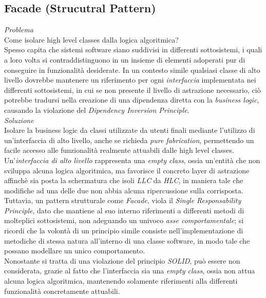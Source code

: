 \documentclass{article}
\begin{document}
\subsection*{Facade (Strucutral Pattern)}
\large
\textit{Problema}\\
Come isolare high level classes dalla logica algoritmica?\vspace*{14pt}\\
Spesso capita che sistemi software siano suddivisi in differenti sottosistemi, i quali a loro volta si contraddistinguono in un insieme di elementi adoperati pur di conseguire in funzionalità desiderate. In un contesto simile qualsiasi classe di alto livello dovrebbe mantenere un riferimento per ogni \textit{interfaccia} implementata nei differenti sottosistemi, in cui se non presente il livello di astrazione necessario, ciò potrebbe tradursi nella creazione di una dipendenza diretta con la \textit{business logic}, causando la violazione del \textit{Dipendency Inversion Principle}.\vspace*{14pt}\\
\textit{Soluzione}\\
Isolare la business logic da classi utilizzate da utenti finali mediante l'utilizzo di un'interfaccia di alto livello, anche se richieda \textit{pure fabrication}, permettendo un facile accesso alle funzionalità realmente attuabili dalle high level classes.\vspace*{14pt}\\
Un'\textit{interfaccia di alto livello} rappresenta una \textit{empty class}, ossia un'entità che non sviluppa alcuna logica algoritmica, ma favorisce il concreto layer di astrazione affinchè sia posta la schermatura che isoli \textit{LLC} da \textit{HLC}, in maniera tale che modifiche ad una delle due non abbia alcuna ripercussione sulla corrisposta.\vspace*{7pt}\\
Tuttavia, un pattern strutturale come \textit{Facade}, viola il \textit{Single Responsability Principle}, dato che mantiene al suo interno riferimenti a differenti metodi di molteplici sottosistemi, non adeguando un univoco \textit{asse comportamentale}; si ricordi che la volontà di un principio simile consiste nell'implementazione di metodiche di stessa natura all'interno di una classe software, in modo tale che possano modellare un unico comportamento.\vspace*{7pt}\\
Nonostante si tratta di una violazione del principio \textit{SOLID}, può essere non considerata, grazie al fatto che l'interfaccia sia una \textit{empty class}, ossia non attua alcuna logica algoritmica, mantenendo solamente riferimenti alla differenti funzionalità concretamente attuabili.
\end{document}

